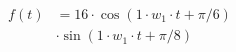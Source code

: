 \begin{center}
\begin{align*}
  f(t) &= 16 \cdot \cos( 1 \cdot w_1 \cdot t + \pi/6 ) \\
  & \cdot \sin( 1 \cdot w_1 \cdot t + \pi/8 )
\end{align*}
\end{center}
